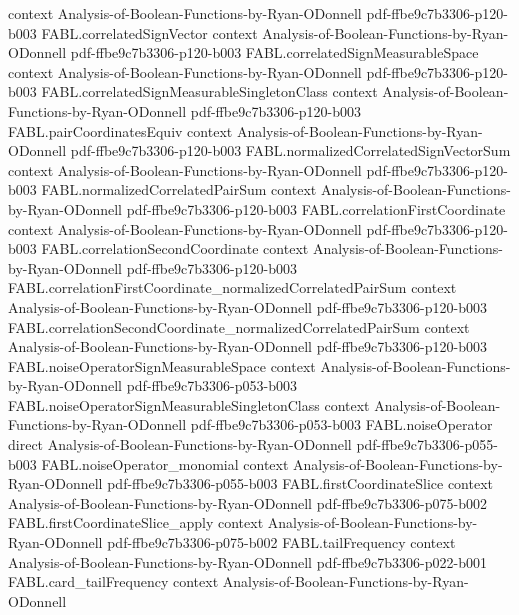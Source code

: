 \begin{theorem}
  {context}
  {Analysis-of-Boolean-Functions-by-Ryan-ODonnell}
  {pdf-ffbe9c7b3306-p120-b003}
\proofstep
  {FABL.correlatedSignVector}
  {context}
  {Analysis-of-Boolean-Functions-by-Ryan-ODonnell}
  {pdf-ffbe9c7b3306-p120-b003}
\proofstep
  {FABL.correlatedSignMeasurableSpace}
  {context}
  {Analysis-of-Boolean-Functions-by-Ryan-ODonnell}
  {pdf-ffbe9c7b3306-p120-b003}
\proofstep
  {FABL.correlatedSignMeasurableSingletonClass}
  {context}
  {Analysis-of-Boolean-Functions-by-Ryan-ODonnell}
  {pdf-ffbe9c7b3306-p120-b003}
\proofstep
  {FABL.pairCoordinatesEquiv}
  {context}
  {Analysis-of-Boolean-Functions-by-Ryan-ODonnell}
  {pdf-ffbe9c7b3306-p120-b003}
\proofstep
  {FABL.normalizedCorrelatedSignVectorSum}
  {context}
  {Analysis-of-Boolean-Functions-by-Ryan-ODonnell}
  {pdf-ffbe9c7b3306-p120-b003}
\proofstep
  {FABL.normalizedCorrelatedPairSum}
  {context}
  {Analysis-of-Boolean-Functions-by-Ryan-ODonnell}
  {pdf-ffbe9c7b3306-p120-b003}
\proofstep
  {FABL.correlationFirstCoordinate}
  {context}
  {Analysis-of-Boolean-Functions-by-Ryan-ODonnell}
  {pdf-ffbe9c7b3306-p120-b003}
\proofstep
  {FABL.correlationSecondCoordinate}
  {context}
  {Analysis-of-Boolean-Functions-by-Ryan-ODonnell}
  {pdf-ffbe9c7b3306-p120-b003}
\proofstep
  {FABL.correlationFirstCoordinate_normalizedCorrelatedPairSum}
  {context}
  {Analysis-of-Boolean-Functions-by-Ryan-ODonnell}
  {pdf-ffbe9c7b3306-p120-b003}
\proofstep
  {FABL.correlationSecondCoordinate_normalizedCorrelatedPairSum}
  {context}
  {Analysis-of-Boolean-Functions-by-Ryan-ODonnell}
  {pdf-ffbe9c7b3306-p120-b003}
\proofstep
  {FABL.noiseOperatorSignMeasurableSpace}
  {context}
  {Analysis-of-Boolean-Functions-by-Ryan-ODonnell}
  {pdf-ffbe9c7b3306-p053-b003}
\proofstep
  {FABL.noiseOperatorSignMeasurableSingletonClass}
  {context}
  {Analysis-of-Boolean-Functions-by-Ryan-ODonnell}
  {pdf-ffbe9c7b3306-p053-b003}
\proofstep
  {FABL.noiseOperator}
  {direct}
  {Analysis-of-Boolean-Functions-by-Ryan-ODonnell}
  {pdf-ffbe9c7b3306-p055-b003}
\proofstep
  {FABL.noiseOperator_monomial}
  {context}
  {Analysis-of-Boolean-Functions-by-Ryan-ODonnell}
  {pdf-ffbe9c7b3306-p055-b003}
\proofstep
  {FABL.firstCoordinateSlice}
  {context}
  {Analysis-of-Boolean-Functions-by-Ryan-ODonnell}
  {pdf-ffbe9c7b3306-p075-b002}
\proofstep
  {FABL.firstCoordinateSlice_apply}
  {context}
  {Analysis-of-Boolean-Functions-by-Ryan-ODonnell}
  {pdf-ffbe9c7b3306-p075-b002}
\proofstep
  {FABL.tailFrequency}
  {context}
  {Analysis-of-Boolean-Functions-by-Ryan-ODonnell}
  {pdf-ffbe9c7b3306-p022-b001}
\proofstep
  {FABL.card_tailFrequency}
  {context}
  {Analysis-of-Boolean-Functions-by-Ryan-ODonnell}

\end{theorem}
